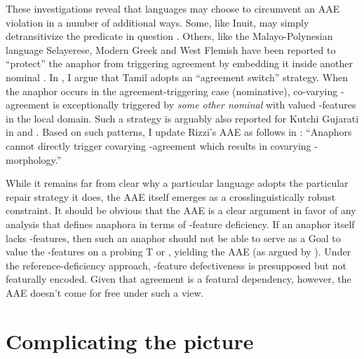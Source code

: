 \documentclass[output=paper, modfonts, nonflat]{langsci/langscibook}
\begin{document}
\noindent These investigations reveal that languages may choose to circumvent an
AAE violation in a number of additional ways. Some, like Inuit, may
simply detransitivize the predicate in question \citep{woolford:1999,
  bokbennema:1991}. Others, like the Malayo-Polynesian language
Selayerese, Modern Greek and West Flemish have been reported to
``protect'' the anaphor from triggering agreement by embedding it
inside another nominal \citep{woolford:1999, haegeman:2004}. In
\citet{sundaresan:2016a}, I argue that Tamil adopts an ``agreement
switch'' strategy. When the anaphor occurs in the agreement-triggering
case (nominative), co-varying \ph-agreement is exceptionally triggered
by \emph{some other nominal} with valued \ph-features in the local
domain. Such a strategy is arguably also reported for Kutchi Gujarati
in \citet{patelgrosz:2014} and \citet{murugrayn:2017}. Based on
such patterns, I update Rizzi's AAE as follows in
\citet[23]{sundaresan:2016a}: ``Anaphors cannot directly trigger
covarying \ph-agreement which results in covarying \ph-morphology.''

While it remains far from clear why a particular language adopts the
particular repair strategy it does, the AAE itself emerges as a
crosslinguistically robust constraint. It should be obvious that the
AAE is a clear argument in favor of any analysis that defines anaphora
in terms of \ph-feature deficiency. If an anaphor itself lacks
\ph-features, then such an anaphor should not be able to serve as a
Goal to value the \ph-features on a probing T or \lilv, yielding the
AAE (as argued by \citealt{kratzer:2009}). Under the
reference-deficiency approach, \ph-feature defectiveness is
presupposed but not featurally encoded. Given that agreement is a
featural dependency, however, the AAE doesn't come for free under such
a view.

\section{Complicating the picture}
\label{secref}
\end{document}
